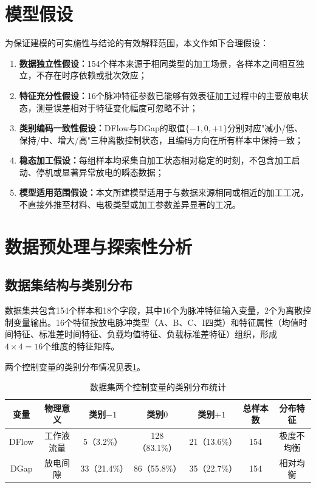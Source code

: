 \documentclass[UTF8,a4paper,12pt]{ctexart}
\begin{document}
\section{模型假设}

为保证建模的可实施性与结论的有效解释范围，本文作如下合理假设：

\begin{enumerate}[label=(\arabic*),leftmargin=2em]
\item \textbf{数据独立性假设：}154个样本来源于相同类型的加工场景，各样本之间相互独立，不存在时序依赖或批次效应；
\item \textbf{特征充分性假设：}16个脉冲特征参数已能够有效表征加工过程中的主要放电状态，测量误差相对于特征变化幅度可忽略不计；
\item \textbf{类别编码一致性假设：}DFlow与DGap的取值$\{-1,0,+1\}$分别对应"减小/低、保持/中、增大/高"三种离散控制状态，且编码方向在所有样本中保持一致；
\item \textbf{稳态加工假设：}每组样本均采集自加工状态相对稳定的时刻，不包含加工启动、停机或显著异常放电的瞬态数据；
\item \textbf{模型适用范围假设：}本文所建模型适用于与数据来源相同或相近的加工工况，不直接外推至材料、电极类型或加工参数差异显著的工况。
\end{enumerate}

\section{数据预处理与探索性分析}

\subsection{数据集结构与类别分布}

数据集共包含154个样本和18个字段，其中16个为脉冲特征输入变量，2个为离散控制变量输出。16个特征按放电脉冲类型（A、B、C、I四类）和特征属性（均值时间特征、标准差时间特征、负载均值特征、负载标准差特征）组织，形成$4\times4=16$个维度的特征矩阵。

两个控制变量的类别分布情况见表\ref{tab:distribution}。

\begin{table}[H]
\centering
\caption{数据集两个控制变量的类别分布统计}
\label{tab:distribution}
\begin{tabular}{ccccccc}
\toprule
变量 & 物理意义 & 类别$-1$ & 类别$0$ & 类别$+1$ & 总样本数 & 分布特征 \\
\midrule
DFlow & 工作液流量 & 5（3.2\%） & 128（83.1\%） & 21（13.6\%） & 154 & 极度不均衡 \\
DGap  & 放电间隙 & 33（21.4\%） & 86（55.8\%） & 35（22.7\%） & 154 & 相对均衡 \\
\bottomrule
\end{tabular}
\end{table}
\end{document}
